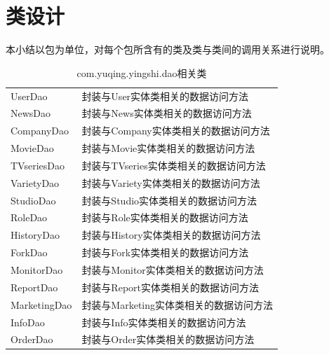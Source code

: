 \section{类设计}
本小结以包为单位，对每个包所含有的类及类与类间的调用关系进行说明。

\begin{table}
	\caption{com.yuqing.yingshi.dao相关类}
	\centering
	\begin{tabular}{|p{3cm}|p{10cm}|} 
		\hline 
		\rowcolor[HTML]{DAE8FC} 
		\multicolumn{2}{|c|}{com.yuqing.yingshi.dao相关类} \\ 
		\hline 
		UserDao&封装与User实体类相关的数据访问方法\\
		NewsDao&封装与News实体类相关的数据访问方法\\
		CompanyDao&封装与Company实体类相关的数据访问方法\\
		MovieDao&封装与Movie实体类相关的数据访问方法\\
		TVseriesDao&封装与TVseries实体类相关的数据访问方法\\
		VarietyDao&封装与Variety实体类相关的数据访问方法\\
		StudioDao&封装与Studio实体类相关的数据访问方法\\
		RoleDao&封装与Role实体类相关的数据访问方法\\
		HistoryDao&封装与History实体类相关的数据访问方法\\
		ForkDao&封装与Fork实体类相关的数据访问方法\\
		MonitorDao&封装与Monitor实体类相关的数据访问方法\\
		ReportDao&封装与Report实体类相关的数据访问方法\\
		MarketingDao&封装与Marketing实体类相关的数据访问方法\\
		InfoDao&封装与Info实体类相关的数据访问方法\\
		OrderDao &封装与Order实体类相关的数据访问方法\\
		\hline 
	\end{tabular}
\end{table}




